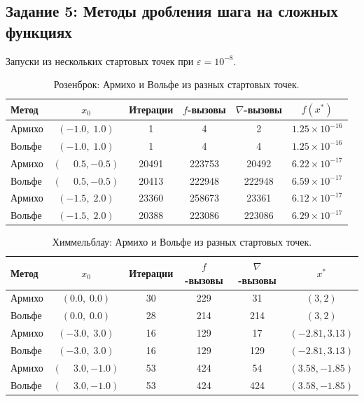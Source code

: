 \documentclass[a4paper,12pt]{article}
\newcommand{\grad}{\nabla}
\newcommand{\eps}{\varepsilon}
\theoremstyle{definition}
\begin{document}
\subsection{Задание 5: Методы дробления шага на сложных функциях}

Запуски из нескольких стартовых точек при $\eps=10^{-8}$.

\begin{table}[H]
\centering
\caption{Розенброк: Армихо и Вольфе из разных стартовых точек.}
\label{tab:complex5_ros}
\begin{tabular}{lccccc}
\toprule
Метод & $x_0$ & Итерации & $f$-вызовы & $\grad$-вызовы & $f(x^*)$ \\
\midrule
Армихо & $(-1.0,\; 1.0)$ & 1 & 4 & 2 & $1.25\times10^{-16}$ \\
Вольфе & $(-1.0,\; 1.0)$ & 1 & 4 & 4 & $1.25\times10^{-16}$ \\
Армихо & $(\phantom{-}0.5, -0.5)$ & 20491 & 223753 & 20492 & $6.22\times10^{-17}$ \\
Вольфе & $(\phantom{-}0.5, -0.5)$ & 20413 & 222948 & 222948 & $6.59\times10^{-17}$ \\
Армихо & $(-1.5,\; 2.0)$ & 23360 & 258673 & 23361 & $6.12\times10^{-17}$ \\
Вольфе & $(-1.5,\; 2.0)$ & 20388 & 223086 & 223086 & $6.29\times10^{-17}$ \\
\bottomrule
\end{tabular}
\end{table}

\begin{table}[H]
\centering
\caption{Химмельблау: Армихо и Вольфе из разных стартовых точек.}
\label{tab:complex5_him}
\begin{tabular}{lccccc}
\toprule
Метод & $x_0$ & Итерации & $f$-вызовы & $\grad$-вызовы & $x^*$ \\
\midrule
Армихо & $(0.0,\; 0.0)$ & 30 & 229 & 31 & $(3,2)$ \\
Вольфе & $(0.0,\; 0.0)$ & 28 & 214 & 214 & $(3,2)$ \\
Армихо & $(-3.0,\; 3.0)$ & 16 & 129 & 17 & $(-2.81,3.13)$ \\
Вольфе & $(-3.0,\; 3.0)$ & 16 & 129 & 129 & $(-2.81,3.13)$ \\
Армихо & $(\phantom{-}3.0, -1.0)$ & 53 & 424 & 54 & $(3.58,-1.85)$ \\
Вольфе & $(\phantom{-}3.0, -1.0)$ & 53 & 424 & 424 & $(3.58,-1.85)$ \\
\bottomrule
\end{tabular}
\end{table}
\end{document}
